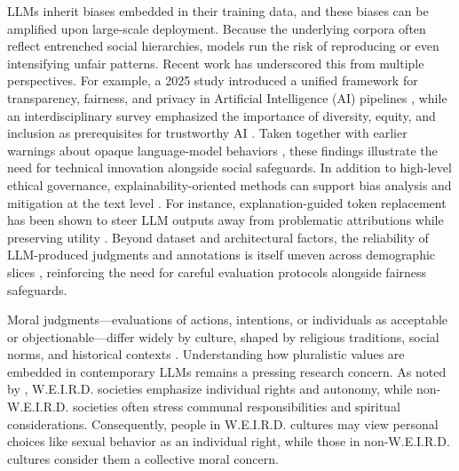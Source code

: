 \documentclass[a4paper,10pt,twoside]{article}
\begin{document}
LLMs inherit biases embedded in their training data, and these biases can be amplified upon large-scale deployment. Because the underlying corpora often reflect entrenched social hierarchies, models run the risk of reproducing or even intensifying unfair patterns. Recent work has underscored this from multiple perspectives. For example, a 2025 study introduced a unified framework for transparency, fairness, and privacy in Artificial Intelligence (AI) pipelines \cite{Radanliev2025}, while an interdisciplinary survey emphasized the importance of diversity, equity, and inclusion as prerequisites for trustworthy AI \cite{cachat2023diversity}. Taken together with earlier warnings about opaque language-model behaviors \cite{Bender2021}, these findings illustrate the need for technical innovation alongside social safeguards. In addition to high-level ethical governance, explainability-oriented methods can support bias analysis and mitigation at the text level \cite{mohammadi2025explainability}. For instance, explanation-guided token replacement has been shown to steer LLM outputs away from problematic attributions while preserving utility \cite{mohammadi2025xtr}. Beyond dataset and architectural factors, the reliability of LLM-produced judgments and annotations is itself uneven across demographic slices \cite{mohammadi2025reliability}, reinforcing the need for careful evaluation protocols alongside fairness safeguards.

Moral judgments---evaluations of actions, intentions, or individuals as acceptable or objectionable---differ widely by culture, shaped by religious traditions, social norms, and historical contexts \cite{Haidt2001,Shweder1997}. Understanding how pluralistic values are embedded in contemporary LLMs remains a pressing research concern. As noted by , W.E.I.R.D. societies emphasize individual rights and autonomy, while non-W.E.I.R.D. societies often stress communal responsibilities and spiritual considerations. Consequently, people in W.E.I.R.D. cultures may view personal choices like sexual behavior as an individual right, while those in non-W.E.I.R.D. cultures consider them a collective moral concern.
\end{document}
